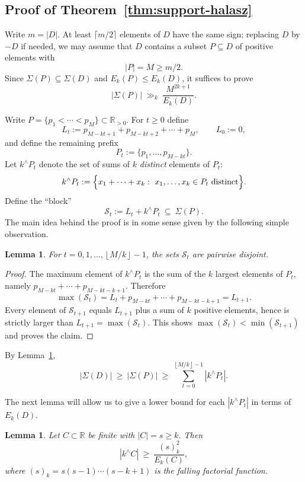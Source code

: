 \documentclass[12pt]{amsart}
\newtheorem{lemma}[theorem]{Lemma}
\theoremstyle{definition}
\theoremstyle{remark}
\newcommand{\RR}{\mathbb{R}}
\newcommand{\abs}[1]{\left|#1\right|}
\newcommand{\bigset}[1]{\Bigl\{#1\Bigr\}}
\newcommand{\floor}[1]{\left\lfloor #1\right\rfloor}
\newcommand{\Sig}{\Sigma}
\begin{document}
\subsection*{Proof of Theorem~\ref{thm:support-halasz}}

Write $m=\abs{D}$. At least $\lceil m/2\rceil$ elements of $D$ have the same sign; replacing $D$ by
$-D$ if needed, we may assume that $D$ contains a subset $P\subseteq D$ of positive elements with
\[
\abs{P}=M\ge m/2.
\]
Since $\Sig(P)\subseteq \Sig(D)$ and $E_k(P)\le E_k(D)$, it suffices to prove
\[
\abs{\Sig(P)}\ \gg_k\ \frac{M^{2k+1}}{E_k(D)}.
\]

Write $P=\{p_1<\cdots<p_M\}\subset\RR_{>0}$. For $t\ge 0$ define
\[
L_t:=p_{M-kt+1}+p_{M-kt+2}+\cdots+p_M,
\qquad L_0:=0,
\]
and define the remaining prefix
\[
P_t:=\{p_1,\dots,p_{M-kt}\}.
\]
Let $k^{\wedge}P_t$ denote the set of sums of $k$ \emph{distinct} elements of $P_t$:
\[
k^{\wedge}P_t:=\bigset{x_1+\cdots+x_k:\ x_1,\dots,x_k\in P_t\ \text{distinct}}.
\]
Define the ``block''
\[
\mathcal{S}_t:=L_t+k^{\wedge}P_t\ \subseteq\ \Sig(P).
\]
The main idea behind the proof is in some sense given by the following simple observation.

\begin{lemma}\label{lem:block-disjoint}
For $t=0,1,\dots,\floor{M/k}-1$, the sets $\mathcal{S}_t$ are pairwise disjoint.
\end{lemma}

\begin{proof}
The maximum element of $k^{\wedge}P_t$ is the sum of the $k$ largest elements of $P_t$, namely
$p_{M-kt}+\cdots+p_{M-kt-k+1}$. Therefore
\[
\max(\mathcal{S}_t)=L_t+p_{M-kt}+\cdots+p_{M-kt-k+1}=L_{t+1}.
\]
Every element of $\mathcal{S}_{t+1}$ equals $L_{t+1}$ plus a sum of $k$ positive elements, hence is
strictly larger than $L_{t+1}=\max(\mathcal{S}_t)$. This shows
$\max(\mathcal{S}_t)<\min(\mathcal{S}_{t+1})$ and proves the claim.
\end{proof}

By Lemma~\ref{lem:block-disjoint},
\begin{equation}\label{eq:block-sum-general}
\abs{\Sig(D)}\ \ge\ \abs{\Sig(P)}\ \ge\ \sum_{t=0}^{\floor{M/k}-1}\abs{k^{\wedge}P_t}.
\end{equation}

The next lemma will allow us to give a lower bound for each $\abs{k^{\wedge}P_t}$ in terms of $E_{k}(D)$.

\begin{lemma}\label{lem:k-sum-from-energy}
Let $C\subset\RR$ be finite with $\abs{C}=s\ge k$. Then
\[
\abs{k^{\wedge}C}\ \ge\ \frac{(s)_k^2}{E_k(C)},
\]
where $(s)_k=s(s-1)\cdots(s-k+1)$ is the falling factorial function.
\end{lemma}
\end{document}
